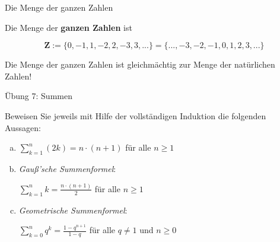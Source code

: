 \documentclass[12pt,ngerman,a4paper,ignorenonframetext,]{beamer}
\begin{document}
\begin{frame}{Die Menge der ganzen Zahlen}
\protect\hypertarget{die-menge-der-ganzen-zahlen}{}

Die Menge der \textbf{ganzen Zahlen} ist

\[ \mathbf{Z} := \{0, -1, 1, -2, 2, -3, 3,...\} = \{...,-3,-2,-1,0,1,2,3,...\} \]

\begin{center}
\end{center}


\begin{Bemerkung}[]

Die Menge der ganzen Zahlen ist gleichmächtig zur Menge der natürlichen
Zahlen!

\end{Bemerkung}

\end{frame}

\begin{frame}{Übung 7: Summen}
\protect\hypertarget{ubung-7-summen}{}

Beweisen Sie jeweils mit Hilfe der vollständigen Induktion die folgenden
Aussagen:

\begin{enumerate}
[a)]
\item
  \(\displaystyle \sum_{k=1}^n (2k) = n\cdot(n+1)\) für alle
  \(n \geq 1\)
\item
  \emph{Gauß'sche Summenformel}:

  \(\displaystyle \sum_{k=1}^n k = \frac{n \cdot (n+1)}{2}\) für alle
  \(n \geq 1\)
\item
  \emph{Geometrische Summenformel}:

  \(\displaystyle \sum_{k=0}^n q^k = \frac{1-q^{n+1}}{1-q}\) für alle
  \(q \ne 1\) und \(n \geq 0\)
\end{enumerate}

\note{}

\end{frame}
\end{document}
